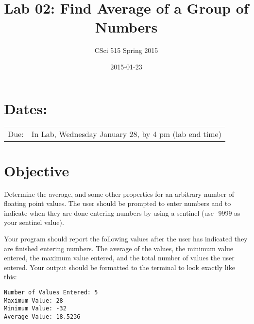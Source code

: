 \documentclass[11pt]{article}
\title{Lab 02: Find Average of a Group of Numbers}
\author{CSci 515 Spring 2015}
\date{2015-01-23}
\begin{document}
\maketitle


\section*{Dates:}
\label{sec-1}


\begin{center}
\begin{tabular}{ll}
 Due:  &  In Lab, Wednesday January 28, by 4 pm (lab end time)  \\
\end{tabular}
\end{center}
\section*{Objective}
\label{sec-2}

Determine the average, and some other properties for an arbitrary
number of floating point values.  The user should be prompted to enter
numbers and to indicate when they are done entering numbers by using a
sentinel (use -9999 as your sentinel value).

Your program should report the following values after the user has
indicated they are finished entering numbers.  The average of the
values, the minimum value entered, the maximum value entered, and the
total number of values the user entered.  Your output should be formatted
to the terminal to look exactly like this:


\begin{verbatim}
Number of Values Entered: 5
Maximum Value: 28
Minimum Value: -32
Average Value: 18.5236
\end{verbatim}
\end{document}
